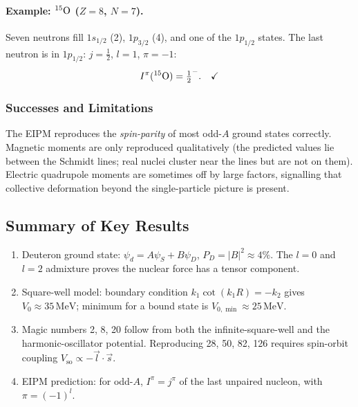 \paragraph{Example: $\nucleus{O}{15}$ ($Z=8$, $N=7$).}
Seven neutrons fill $1s_{1/2}$ (2), $1p_{3/2}$ (4), and one of the $1p_{1/2}$
states.  The last neutron is in $1p_{1/2}$: $j=\frac{1}{2}$, $l=1$,
$\pi=-1$:
\begin{equation}
  I^\pi(\nucleus{O}{15}) = \tfrac{1}{2}^-.\quad \checkmark
\end{equation}

\subsubsection*{Successes and Limitations}
The EIPM reproduces the \emph{spin-parity} of most odd-$A$ ground states correctly.
Magnetic moments are only reproduced qualitatively (the predicted values lie
between the Schmidt lines; real nuclei cluster near the lines but are not on
them).  Electric quadrupole moments are sometimes off by large factors, signalling
that collective deformation beyond the single-particle picture is present.


\subsection*{Summary of Key Results}

\begin{enumerate}
  \item Deuteron ground state: $\psi_d=A\psi_S+B\psi_D$,
    $P_D=|B|^2\approx4\%$.  The $l=0$ and $l=2$ admixture proves the nuclear
    force has a tensor component.
  \item Square-well model: boundary condition $k_1\cot(k_1 R)=-k_2$ gives
    $V_0\approx35\,\mathrm{MeV}$; minimum for a bound state is
    $V_{0,\min}\approx25\,\mathrm{MeV}$.
  \item Magic numbers 2, 8, 20 follow from both the infinite-square-well and
    the harmonic-oscillator potential.  Reproducing 28, 50, 82, 126 requires
    spin-orbit coupling $V_\mathrm{so}\propto-\vec{l}\cdot\vec{s}$.
  \item EIPM prediction: for odd-$A$, $I^\pi=j^\pi$ of the last unpaired
    nucleon, with $\pi=(-1)^l$.
\end{enumerate}
